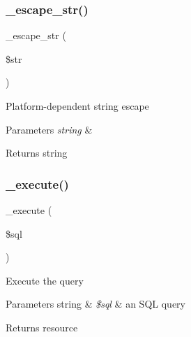 \subsubsection{\texorpdfstring{\+\_\+escape\+\_\+str()}{\_escape\_str()}}
{\footnotesize\ttfamily \+\_\+escape\+\_\+str (\begin{DoxyParamCaption}\item[{}]{\$str }\end{DoxyParamCaption})\hspace{0.3cm}{\ttfamily [protected]}}

Platform-\/dependent string escape


\begin{DoxyParams}{Parameters}
{\em string} & \\
\hline
\end{DoxyParams}
\begin{DoxyReturn}{Returns}
string 
\end{DoxyReturn}
\mbox{\label{class_c_i___d_b__postgre__driver_a114ab675d89bf8324a41785fb475e86d}} 
\subsubsection{\texorpdfstring{\+\_\+execute()}{\_execute()}}
{\footnotesize\ttfamily \+\_\+execute (\begin{DoxyParamCaption}\item[{}]{\$sql }\end{DoxyParamCaption})\hspace{0.3cm}{\ttfamily [protected]}}

Execute the query


\begin{DoxyParams}[1]{Parameters}
string & {\em \$sql} & an S\+QL query \\
\hline
\end{DoxyParams}
\begin{DoxyReturn}{Returns}
resource 
\end{DoxyReturn}
\mbox{\label{class_c_i___d_b__postgre__driver_a3a02ea06541b8ecc25a33a61651562c8}} 

